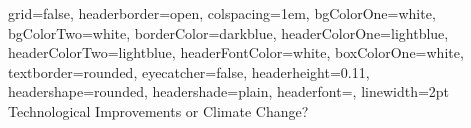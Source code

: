 \documentclass[a0paper,portrait]{baposter}
\begin{document}


\newenvironment{myindentpar}[1]%
  {\begin{list}{}%
          {\setlength{\leftmargin}{#1}}%
          \item[]%
  }
  {\end{list}}



\begin{poster}
{
grid=false,
headerborder=open, %
colspacing=1em, %
bgColorOne=white, %
bgColorTwo=white, %
borderColor=darkblue, %
headerColorOne=lightblue, %
headerColorTwo=lightblue, %
headerFontColor=white, %
boxColorOne=white, %
textborder=rounded, %
eyecatcher=false, %
headerheight=0.11\textheight, %
headershape=rounded, %
headershade=plain,
headerfont=\Large\textsf, %
linewidth=2pt %
}
{}
%
%
{
\textsf %
{
\vspace{1em}\\
Technological Improvements or Climate Change? \\
\vspace{0.1mm}\\
}}
\end{poster}
\end{document}
